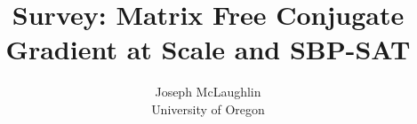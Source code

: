 \title{Survey: Matrix Free Conjugate Gradient at Scale and SBP-SAT}
\author{Joseph McLaughlin \\ University of Oregon}